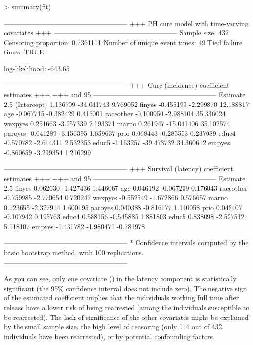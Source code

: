 \begin{example}
> summary(fit)

------------------------------------------------------
+++   PH cure model with time-varying covariates   +++
------------------------------------------------------
Sample size: 432
Censoring proportion: 0.7361111
Number of unique event times: 49
Tied failure times: TRUE

log-likelihood:  -643.65 

------------------------------------------------------
+++     Cure (incidence) coefficient estimates     +++
+++          and 95%
------------------------------------------------------
             Estimate       2.5%
(Intercept)  1.136709 -34.041743  9.769052
finyes      -0.455199  -2.299870 12.188817
age         -0.067715  -0.382429  0.413001
raceother   -0.100950  -2.988104 35.336024
wexpyes      0.251663  -3.257339  2.193371
marno        0.261947 -15.041406 35.102574
paroyes     -0.041289  -3.156395  1.659637
prio         0.068443  -0.285553  0.237089
educ4       -0.570782  -2.614311  2.532353
educ5       -1.163257 -39.473732 34.360612
empyes      -0.860659  -3.299354  1.216299

------------------------------------------------------
+++    Survival (latency) coefficient estimates    +++
+++          and 95%
------------------------------------------------------
           Estimate      2.5%
finyes     0.062630 -1.427436  1.446067
age        0.046192 -0.067209  0.176043
raceother -0.759985 -2.770654  0.720247
wexpyes   -0.552549 -1.672866  0.576657
marno      0.123655 -2.327914  1.600195
paroyes    0.040388 -0.816177  1.110058
prio       0.048407 -0.107942  0.195763
educ4      0.588156 -0.545885  1.881803
educ5      0.838098 -2.527512  5.118107
empyes    -1.431782 -1.980471 -0.781978

------------------------------------------------------
* Confidence intervals computed by the basic 
  bootstrap method, with 100 replications.
------------------------------------------------------
\end{example}

As you can see, only one covariate () in the latency component is statistically significant (the 95\% confidence interval does not include zero). The negative sign of the estimated coefficient implies that the individuals working full time after release have a lower risk of being rearrested (among the individuals susceptible to be rearrested). 
The lack of significance of the other covariates might be explained by the small sample size, the high level of censoring (only 114 out of 432 individuals have been rearrested), or by potential confounding factors. 

